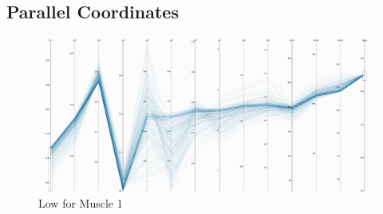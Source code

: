 \subsection{Parallel Coordinates}

\begin{figure}[ht]
   \begin{center}
    \includegraphics[width=1.0\textwidth]{figs/X_a8_lower.png}
  \end{center}
  \caption{Low for Muscle 1}
  \label{fig_low}
\end{figure}



